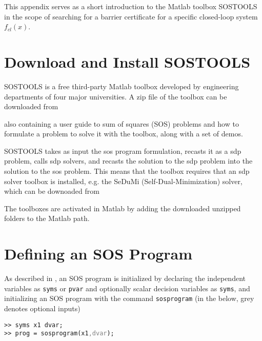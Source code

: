 This appendix serves as a short introduction to the Matlab toolbox SOSTOOLS in the scope of searching for a barrier certificate for a specific closed-loop system $f_{cl}(x)$.

\section{Download and Install SOSTOOLS}
\vspace*{-3mm}
SOSTOOLS is a free third-party Matlab toolbox developed by engineering departments of four major universities. A zip file of the toolbox can be downloaded from 

\hspace{1cm} {}

also containing a user guide \citep{bib:sostools_manual} to sum of squares (SOS) problems and how to formulate a problem to solve it with the toolbox, along with a set of demos. 

SOSTOOLS takes as input the \gls{sos} program formulation, recasts it as a \gls{sdp} problem, calls \gls{sdp} solvers, and recasts the solution to the \gls{sdp} problem into the solution to the \gls{sos} problem. This means that the toolbox requires that an \gls{sdp} solver toolbox is installed, e.g. the SeDuMi (Self-Dual-Minimization) solver, which can be downoaded from

\hspace{1cm} {}

The toolboxes are activated in Matlab by adding the downloaded unzipped folders to the Matlab path.

\section{Defining an SOS Program}
\vspace*{-3mm}
As described in \citep{bib:sostools_manual}, an SOS program is initialized by declaring the independent variables as \texttt{syms} or \texttt{pvar} and optionally scalar decision variables as \texttt{syms}, and initializing an SOS program with the command \texttt{sosprogram} (in the below, grey denotes optional inputs)

\hspace*{1cm} \texttt{>> syms x1 dvar;}\\
\hspace*{1cm} \texttt{>> prog = sosprogram(x1\textcolor{grey}{,dvar});}

